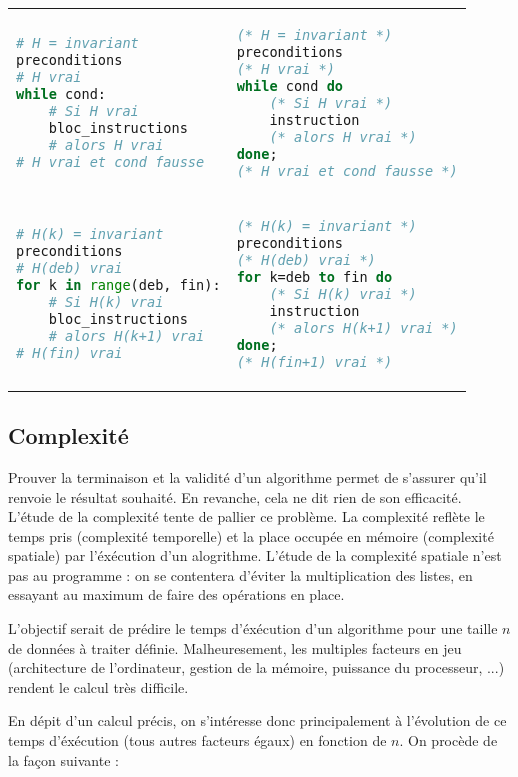 \documentclass{hibiscus}
\begin{document}
\begin{tabular}{p{} p{}}
\begin{lstlisting}[language=Python]
# H = invariant
preconditions
# H vrai
while cond:
    # Si H vrai
    bloc_instructions
    # alors H vrai
# H vrai et cond fausse
\end{lstlisting}
&
\begin{lstlisting}[language=Caml]
(* H = invariant *)
preconditions
(* H vrai *)
while cond do
    (* Si H vrai *)
    instruction
    (* alors H vrai *)
done;
(* H vrai et cond fausse *)
\end{lstlisting} \\
\begin{lstlisting}[language=Python]
# H(k) = invariant
preconditions
# H(deb) vrai
for k in range(deb, fin):
    # Si H(k) vrai
    bloc_instructions
    # alors H(k+1) vrai
# H(fin) vrai
\end{lstlisting}
&
\begin{lstlisting}[language=Caml]
(* H(k) = invariant *)
preconditions
(* H(deb) vrai *)
for k=deb to fin do
    (* Si H(k) vrai *)
    instruction
    (* alors H(k+1) vrai *)
done;
(* H(fin+1) vrai *)
\end{lstlisting}
\end{tabular}

\subsection{Complexité}

\par Prouver la terminaison et la validité d'un algorithme permet de s'assurer qu'il renvoie le résultat souhaité. En revanche, cela ne dit rien de son efficacité. L'étude de la complexité tente de pallier ce problème. La complexité reflète le temps pris (complexité temporelle) et la place occupée en mémoire (complexité spatiale) par l'éxécution d'un alogrithme.  L'étude de la complexité spatiale n'est pas au programme : on se contentera d'éviter la multiplication des listes, en essayant au maximum de faire des opérations en place.

\medskip \par L'objectif serait de prédire le temps d'éxécution d'un algorithme pour une taille $n$ de données à traiter définie. Malheuresement, les multiples facteurs en jeu (architecture de l'ordinateur, gestion de la mémoire, puissance du processeur, ...) rendent le calcul très difficile.

\medskip \par En dépit d'un calcul précis, on s'intéresse donc principalement à l'évolution de ce temps d'éxécution (tous autres facteurs égaux) en fonction de $n$. On procède de la façon suivante :
\end{document}
